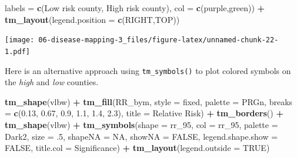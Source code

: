\documentclass[
]{book}
\newenvironment{Shaded}{\begin{snugshade}}{\end{snugshade}}
\newcommand{\AttributeTok}[1]{\textcolor[rgb]{0.13,0.29,0.53}{#1}}
\newcommand{\ConstantTok}[1]{\textcolor[rgb]{0.56,0.35,0.01}{#1}}
\newcommand{\DecValTok}[1]{\textcolor[rgb]{0.00,0.00,0.81}{#1}}
\newcommand{\FloatTok}[1]{\textcolor[rgb]{0.00,0.00,0.81}{#1}}
\newcommand{\FunctionTok}[1]{\textcolor[rgb]{0.13,0.29,0.53}{\textbf{#1}}}
\newcommand{\NormalTok}[1]{#1}
\newcommand{\SpecialCharTok}[1]{\textcolor[rgb]{0.81,0.36,0.00}{\textbf{#1}}}
\newcommand{\StringTok}[1]{\textcolor[rgb]{0.31,0.60,0.02}{#1}}
\begin{document}
\begin{Shaded}
\begin{Highlighting}[]
                \AttributeTok{labels =} \FunctionTok{c}\NormalTok{(}\StringTok{\textquotesingle{}Low risk county\textquotesingle{}}\NormalTok{, }\StringTok{\textquotesingle{}High risk county\textquotesingle{}}\NormalTok{), }
                \AttributeTok{col =} \FunctionTok{c}\NormalTok{(}\StringTok{\textquotesingle{}purple\textquotesingle{}}\NormalTok{,}\StringTok{\textquotesingle{}green\textquotesingle{}}\NormalTok{)) }\SpecialCharTok{+}
  \FunctionTok{tm\_layout}\NormalTok{(}\AttributeTok{legend.position =} \FunctionTok{c}\NormalTok{(}\StringTok{\textquotesingle{}RIGHT\textquotesingle{}}\NormalTok{,}\StringTok{\textquotesingle{}TOP\textquotesingle{}}\NormalTok{))}
\end{Highlighting}
\end{Shaded}

\texttt{[image: 06-disease-mapping-3\_files/figure-latex/unnamed-chunk-22-1.pdf]}

Here is an alternative approach using \texttt{tm\_symbols()} to plot colored symbols on the \emph{high} and \emph{low} counties.

\begin{Shaded}
\begin{Highlighting}[]
\FunctionTok{tm\_shape}\NormalTok{(vlbw) }\SpecialCharTok{+}
  \FunctionTok{tm\_fill}\NormalTok{(}\StringTok{\textquotesingle{}RR\_bym\textquotesingle{}}\NormalTok{,}
          \AttributeTok{style =} \StringTok{\textquotesingle{}fixed\textquotesingle{}}\NormalTok{,}
          \AttributeTok{palette =} \StringTok{\textquotesingle{}PRGn\textquotesingle{}}\NormalTok{,}
          \AttributeTok{breaks =} \FunctionTok{c}\NormalTok{(}\FloatTok{0.13}\NormalTok{, }\FloatTok{0.67}\NormalTok{, }\FloatTok{0.9}\NormalTok{, }\FloatTok{1.1}\NormalTok{, }\FloatTok{1.4}\NormalTok{, }\FloatTok{2.3}\NormalTok{),}
          \AttributeTok{title =} \StringTok{\textquotesingle{}Relative Risk\textquotesingle{}}\NormalTok{) }\SpecialCharTok{+}
  \FunctionTok{tm\_borders}\NormalTok{() }\SpecialCharTok{+} 
\FunctionTok{tm\_shape}\NormalTok{(vlbw) }\SpecialCharTok{+} 
  \FunctionTok{tm\_symbols}\NormalTok{(}\AttributeTok{shape =} \StringTok{\textquotesingle{}rr\_95\textquotesingle{}}\NormalTok{,}
             \AttributeTok{col =} \StringTok{\textquotesingle{}rr\_95\textquotesingle{}}\NormalTok{,}
             \AttributeTok{palette =} \StringTok{\textquotesingle{}Dark2\textquotesingle{}}\NormalTok{,}
             \AttributeTok{size =}\NormalTok{ .}\DecValTok{5}\NormalTok{,}
             \AttributeTok{shapeNA =} \ConstantTok{NA}\NormalTok{,}
             \AttributeTok{showNA =} \ConstantTok{FALSE}\NormalTok{,}
             \AttributeTok{legend.shape.show =} \ConstantTok{FALSE}\NormalTok{,}
            \AttributeTok{title.col =} \StringTok{\textquotesingle{}Significance\textquotesingle{}}\NormalTok{) }\SpecialCharTok{+}
  \FunctionTok{tm\_layout}\NormalTok{(}\AttributeTok{legend.outside =} \ConstantTok{TRUE}\NormalTok{)}
\end{Highlighting}
\end{Shaded}
\end{document}
